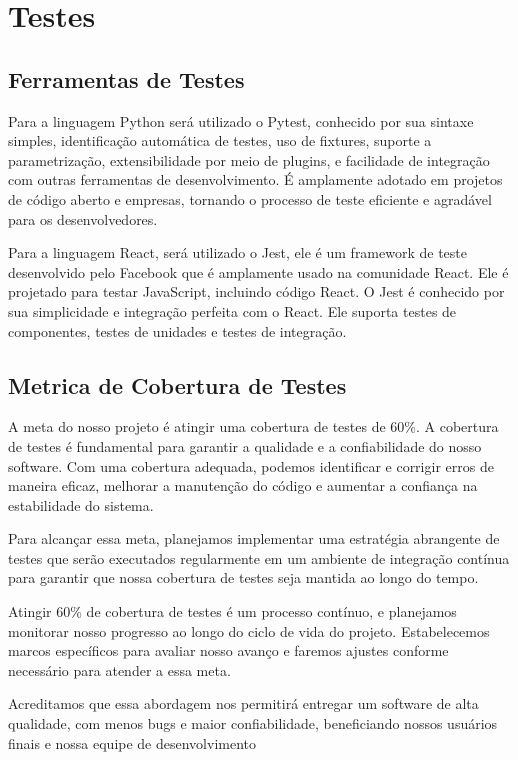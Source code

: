 \section{Testes}
\subsection{Ferramentas de Testes}

\par Para a linguagem Python será utilizado o Pytest, conhecido por sua sintaxe simples, identificação automática de testes, uso de fixtures, suporte a parametrização, extensibilidade por meio de plugins, e facilidade de integração com outras ferramentas de desenvolvimento. É amplamente adotado em projetos de código aberto e empresas, tornando o processo de teste eficiente e agradável para os desenvolvedores.

\par Para a linguagem React, será utilizado o Jest, ele é um framework de teste desenvolvido pelo Facebook que é amplamente usado na comunidade React. Ele é projetado para testar JavaScript, incluindo código React. O Jest é conhecido por sua simplicidade e integração perfeita com o React. Ele suporta testes de componentes, testes de unidades e testes de integração.

\subsection{Metrica de Cobertura de Testes}
\par A meta do nosso projeto é atingir uma cobertura de testes de 60\%. A cobertura de testes é fundamental para garantir a qualidade e a confiabilidade do nosso software. Com uma cobertura adequada, podemos identificar e corrigir erros de maneira eficaz, melhorar a manutenção do código e aumentar a confiança na estabilidade do sistema.
\par Para alcançar essa meta, planejamos implementar uma estratégia abrangente de testes que serão executados regularmente em um ambiente de integração contínua para garantir que nossa cobertura de testes seja mantida ao longo do tempo.
\par Atingir 60\% de cobertura de testes é um processo contínuo, e planejamos monitorar nosso progresso ao longo do ciclo de vida do projeto. Estabelecemos marcos específicos para avaliar nosso avanço e faremos ajustes conforme necessário para atender a essa meta.
\par Acreditamos que essa abordagem nos permitirá entregar um software de alta qualidade, com menos bugs e maior confiabilidade, beneficiando nossos usuários finais e nossa equipe de desenvolvimento

